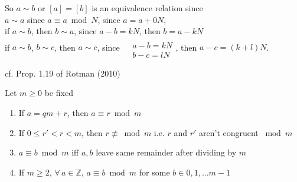 So $a\sim b$ or $[a] = [b]$ is an equivalence relation since \\
$a\sim a$ since $a\equiv a \bmod{N}$, since $a=a+0N$, \\
if $a\sim b$, then $b\sim a$, since $a-b=kN$, then $b=a-kN$ \\
if $a\sim b$, $b\sim c$, then $a\sim c$, since $\begin{aligned} & \quad \\ 
	& a-b = kN \\
	& b-c = lN \end{aligned}$, then $a-c = (k+l)N$.  
	
	



cf. Prop. 1.19 of Rotman (2010) \cite{agat:JRotman2010}  
\begin{proposition}
Let $m\geq 0$ be fixed 
\begin{enumerate}
	\item If $a=qm +r$, then $a \equiv r \bmod{m}$ 
	\item  If $0\leq r' <r <m$, then $r \not\equiv\bmod{m}$ i.e. $r$ and $r'$ aren't congruent $\bmod{m}$  
	\item $a \equiv b \bmod{m}$ iff $a,b$ leave same remainder after dividing by $m$  
	\item If $m\geq 2$, $\forall \, a \in \mathbb{Z}$, $a \equiv b \bmod{m}$ for some $b\in 0,1,\dots m-1$  
\end{enumerate}	
\end{proposition}

